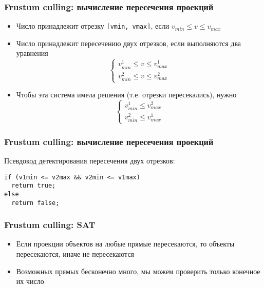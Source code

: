 \documentclass{beamer}
\begin{document}
\begin{frame}[fragile]
\fontsize{10pt}{10pt}
\frametitle{Frustum culling: вычисление пересечения проекций}
\begin{itemize}
\item Число принадлежит отрезку \verb|[vmin, vmax]|, если \begin{math}v_{min} \leq v \leq v_{max}\end{math}
\pause
\item Число принадлежит пересечению двух отрезков, если выполняются два уравнения
\begin{equation}
\begin{cases}
v^1_{min} \leq v \leq v^1_{max} \\
v^2_{min} \leq v \leq v^2_{max}
\end{cases}
\end{equation}
\pause
\item Чтобы эта система имела решения (т.е. отрезки пересекались), нужно
\begin{equation}
\begin{cases}
v^1_{min} \leq v^2_{max} \\
v^2_{min} \leq v^1_{max}
\end{cases}
\end{equation}
\end{itemize}
\end{frame}

\begin{frame}[fragile]
\fontsize{10pt}{10pt}
\frametitle{Frustum culling: вычисление пересечения проекций}
Псевдокод детектирования пересечения двух отрезков:
\begin{verbatim}
if (v1min <= v2max && v2min <= v1max)
  return true;
else
  return false;
\end{verbatim}
\end{frame}

\begin{frame}[fragile]
\frametitle{Frustum culling: SAT}
\begin{itemize}
\item Если проекции объектов на любые прямые пересекаются, то объекты пересекаются, иначе \textendash{} не пересекаются
\pause
\item Возможных прямых бесконечно много, мы можем проверить только конечное их число
\end{itemize}
\end{frame}
\end{document}

